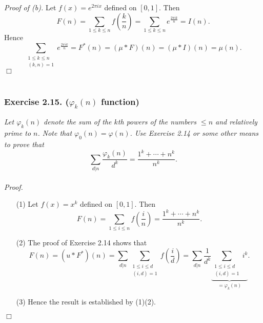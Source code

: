 \documentclass{article}
\begin{document}
\emph{Proof of (b).}
  Let $f(x) = e^{2\pi i x}$ defined on $[0,1]$.
  Then
  \[
    F(n)
    = \sum_{1 \leq k \leq n} f\left( \frac{k}{n} \right)
    = \sum_{1 \leq k \leq n} e^{\frac{2\pi i k}{n}}
    = I(n).
  \]
  Hence
  \[
    \sum_{\substack{1 \leq k \leq n \\ (k,n)=1}} e^{\frac{2\pi i k}{n}}
    = F^{*}(n)
    = (\mu * F)(n)
    = (\mu * I)(n)
    = \mu(n).
  \]
$\Box$ \\\\






\subsubsection*{Exercise 2.15. ($\varphi_k(n)$ function)}
\emph{Let $\varphi_k(n)$ denote the sum of the $k$th powers of
the numbers $\leq n$ and relatively prime to $n$.
Note that $\varphi_0(n) = \varphi(n)$.
Use Exercise 2.14 or some other means to prove that
\[
  \sum_{d|n} \frac{\varphi_k(n)}{d^k} = \frac{1^k + \cdots + n^k}{n^k}.
\]} \\



\emph{Proof.}
\begin{enumerate}
\item[(1)]
  Let $f(x) = x^k$ defined on $[0,1]$.
  Then
  \[
    F(n)
    = \sum_{1 \leq i \leq n} f\left( \frac{i}{n} \right)
    = \frac{1^k + \cdots + n^k}{n^k}.
  \]

\item[(2)]
  The proof of Exercise 2.14 shows that
  \[
    F(n)
    = (u * F^{*})(n)
    = \sum_{d|n} \sum_{\substack{1 \leq i \leq d \\ (i,d)=1}} f\left( \frac{i}{d} \right)
    = \sum_{d|n} \frac{1}{d^k}
      \underbrace{\sum_{\substack{1 \leq i \leq d \\ (i,d)=1}} i^k}_{= \varphi_k(n)}.
  \]

\item[(3)]
  Hence the result is established by (1)(2).
\end{enumerate}
$\Box$ \\\\



\end{document}

